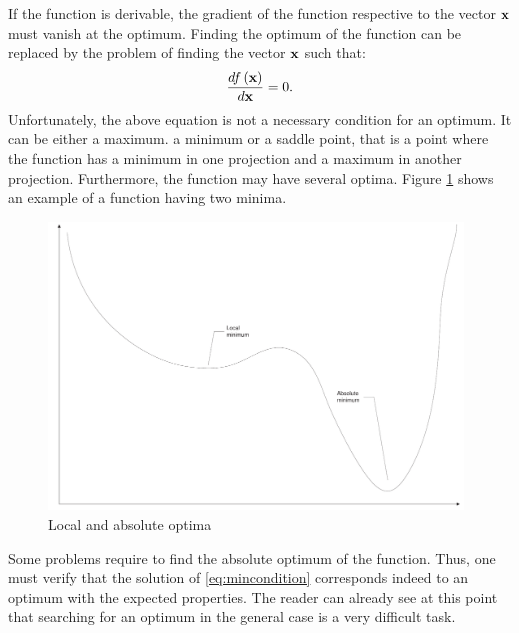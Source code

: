 If the function is derivable, the gradient of the function
respective to the vector ${\textbf x}$ must vanish at the optimum.
Finding the optimum of the function can be replaced by the problem
of finding the vector ${\textbf x}$ such that:
\begin{equation}
\label{eq:mincondition}
  {d f\left({\textbf x}\right) \over d{\textbf x}} = 0.
\end{equation}
Unfortunately, the above equation is not a necessary condition for
an optimum. It can be either a maximum. a minimum or a saddle
point, that is a point where the function has a minimum in one
projection and a maximum in another projection. Furthermore, the
function may have several optima. Figure \ref{fig:localabsobulte}
shows an example of a function having two minima.
\begin{figure}
\centering\includegraphics[width=11cm]{Figures/MinimumAbsLoc}
\caption{Local and absolute optima} \label{fig:localabsobulte}
\end{figure}
Some problems require to find the absolute optimum of the
function. Thus, one must verify that the solution of
\ref{eq:mincondition} corresponds indeed to an optimum with the
expected properties.
The reader can already see at this point that
searching for an optimum in the general case is a very difficult
task.

